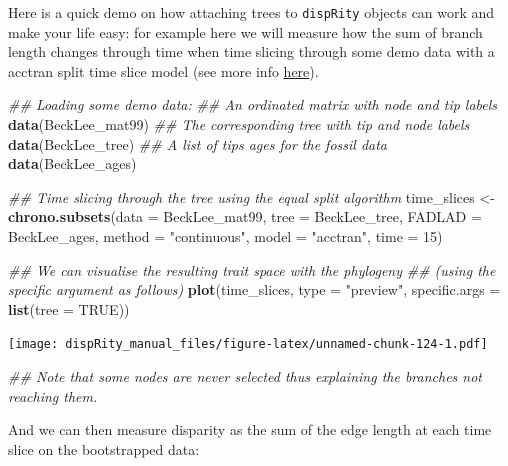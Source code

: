 \documentclass[
]{book}
\newenvironment{Shaded}{\begin{snugshade}}{\end{snugshade}}
\newcommand{\CommentTok}[1]{\textcolor[rgb]{0.56,0.35,0.01}{\textit{#1}}}
\newcommand{\DataTypeTok}[1]{\textcolor[rgb]{0.13,0.29,0.53}{#1}}
\newcommand{\DecValTok}[1]{\textcolor[rgb]{0.00,0.00,0.81}{#1}}
\newcommand{\KeywordTok}[1]{\textcolor[rgb]{0.13,0.29,0.53}{\textbf{#1}}}
\newcommand{\NormalTok}[1]{#1}
\newcommand{\OtherTok}[1]{\textcolor[rgb]{0.56,0.35,0.01}{#1}}
\newcommand{\StringTok}[1]{\textcolor[rgb]{0.31,0.60,0.02}{#1}}
\begin{document}
Here is a quick demo on how attaching trees to \texttt{dispRity} objects can work and make your life easy: for example here we will measure how the sum of branch length changes through time when time slicing through some demo data with a acctran split time slice model (see more info \protect\hyperlink{chrono-subsets}{here}).

\begin{Shaded}
\begin{Highlighting}[]
\CommentTok{\#\# Loading some demo data:}
\CommentTok{\#\# An ordinated matrix with node and tip labels}
\KeywordTok{data}\NormalTok{(BeckLee\_mat99)}
\CommentTok{\#\# The corresponding tree with tip and node labels}
\KeywordTok{data}\NormalTok{(BeckLee\_tree)}
\CommentTok{\#\# A list of tips ages for the fossil data}
\KeywordTok{data}\NormalTok{(BeckLee\_ages)}

\CommentTok{\#\# Time slicing through the tree using the equal split algorithm}
\NormalTok{time\_slices \textless{}{-}}\StringTok{ }\KeywordTok{chrono.subsets}\NormalTok{(}\DataTypeTok{data   =}\NormalTok{ BeckLee\_mat99,}
                              \DataTypeTok{tree   =}\NormalTok{ BeckLee\_tree,}
                              \DataTypeTok{FADLAD =}\NormalTok{ BeckLee\_ages,}
                              \DataTypeTok{method =} \StringTok{"continuous"}\NormalTok{,}
                              \DataTypeTok{model  =} \StringTok{"acctran"}\NormalTok{,}
                              \DataTypeTok{time   =} \DecValTok{15}\NormalTok{)}

\CommentTok{\#\# We can visualise the resulting trait space with the phylogeny}
\CommentTok{\#\# (using the specific argument as follows)}
\KeywordTok{plot}\NormalTok{(time\_slices, }\DataTypeTok{type =} \StringTok{"preview"}\NormalTok{,}
     \DataTypeTok{specific.args =} \KeywordTok{list}\NormalTok{(}\DataTypeTok{tree =} \OtherTok{TRUE}\NormalTok{))}
\end{Highlighting}
\end{Shaded}

\texttt{[image: dispRity\_manual\_files/figure-latex/unnamed-chunk-124-1.pdf]}

\begin{Shaded}
\begin{Highlighting}[]
\CommentTok{\#\# Note that some nodes are never selected thus explaining the branches not reaching them.}
\end{Highlighting}
\end{Shaded}

And we can then measure disparity as the sum of the edge length at each time slice on the bootstrapped data:
\end{document}
